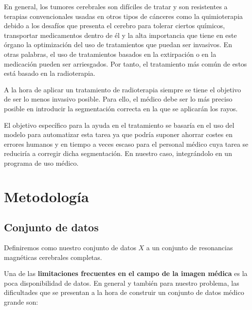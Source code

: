 En general, los tumores cerebrales son difíciles de tratar y son resistentes a terapias convencionales usadas en otros tipos de cánceres como la quimioterapia debido a los desafíos que presenta el cerebro para tolerar ciertos químicos, transportar medicamentos dentro de él y la alta importancia que tiene en este órgano la optimización del uso de tratamientos que puedan ser invasivos. En otras palabras, el uso de tratamientos basados en la extirpación o en la medicación pueden ser arriesgados. Por tanto, el tratamiento más común de estos está basado en la radioterapia.

A la hora de aplicar un tratamiento de radioterapia siempre se tiene el objetivo de ser lo menos invasivo posible. Para ello, el médico debe ser lo más preciso posible en introducir la segmentación correcta en la que se aplicarán los rayos. 

El objetivo específico para la ayuda en el tratamiento se basaría en el uso del modelo para automatizar esta tarea ya que podría suponer ahorrar costes en errores humanos y en tiempo a veces escaso para el personal médico cuya tarea se reduciría a corregir dicha segmentación. En nuestro caso, integrándolo en un programa de uso médico.
 


\section{Metodología}

\subsection{Conjunto de datos}

Definiremos como nuestro conjunto de datos \textbf{$X$} a un conjunto de resonancias magnéticas cerebrales completas.

Una de las \textbf{limitaciones frecuentes en el campo de la imagen médica} es la poca disponibilidad de datos. En general y también para nuestro problema, las dificultades que se presentan a la hora de construir un conjunto de datos médico grande son:

